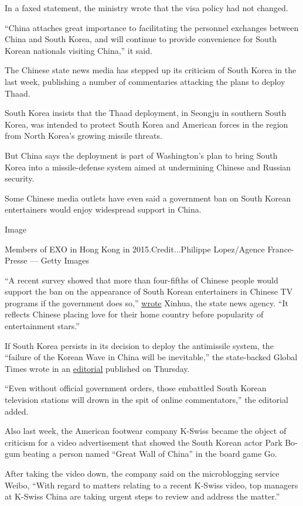 In a faxed statement, the ministry wrote that the visa policy had not
changed.

``China attaches great importance to facilitating the personnel
exchanges between China and South Korea, and will continue to provide
convenience for South Korean nationals visiting China,'' it said.

The Chinese state news media has stepped up its criticism of South Korea
in the last week, publishing a number of commentaries attacking the
plans to deploy Thaad.

South Korea insists that the Thaad deployment, in Seongju in southern
South Korea, was intended to protect South Korea and American forces in
the region from North Korea's growing missile threats.

But China says the deployment is part of Washington's plan to bring
South Korea into a missile-defense system aimed at undermining Chinese
and Russian security.

Some Chinese media outlets have even said a government ban on South
Korean entertainers would enjoy widespread support in China.

Image

Members of EXO in Hong Kong in 2015.Credit...Philippe Lopez/Agence
France-Presse --- Getty Images

``A recent survey showed that more than four-fifths of Chinese people
would support the ban on the appearance of South Korean entertainers in
Chinese TV programs if the government does so,''
\href{http://news.xinhuanet.com/english/2016-08/04/c_135563560.htm}{wrote}
Xinhua, the state news agency. ``It reflects Chinese placing love for
their home country before popularity of entertainment stars.''

If South Korea persists in its decision to deploy the antimissile
system, the ``failure of the Korean Wave in China will be inevitable,''
the state-backed Global Times wrote in an
\href{http://opinion.huanqiu.com/editorial/2016-08/9262614.html}{editorial}
published on Thursday.

``Even without official government orders, those embattled South Korean
television stations will drown in the spit of online commentators,'' the
editorial added.

Also last week, the American footwear company K-Swiss became the object
of criticism for a video advertisement that showed the South Korean
actor Park Bo-gum beating a person named ``Great Wall of China'' in the
board game Go.

After taking the video down, the company said on the microblogging
service Weibo, ``With regard to matters relating to a recent K-Swiss
video, top managers at K-Swiss China are taking urgent steps to review
and address the matter.''

